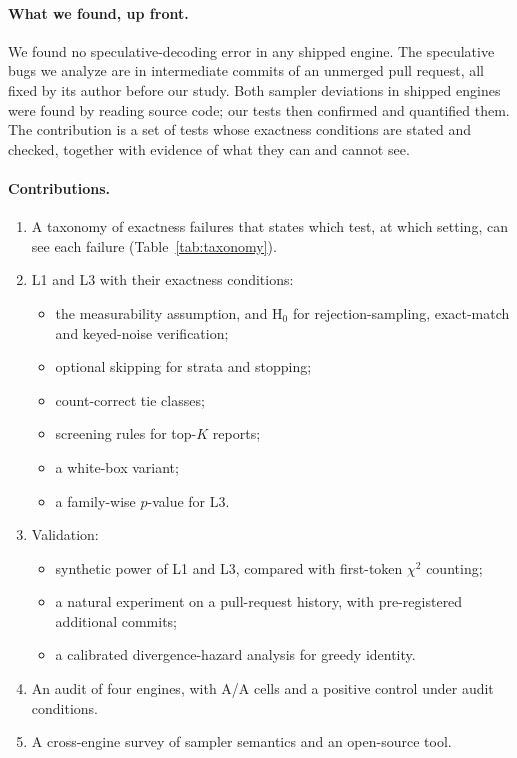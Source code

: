 \documentclass[10pt]{article}
\theoremstyle{remark}
\begin{document}
\paragraph{What we found, up front.} We found no speculative-decoding error in any shipped engine. The speculative bugs we analyze are in intermediate commits of an unmerged pull request, all fixed by its author before our study. Both sampler deviations in shipped engines were found by reading source code; our tests then confirmed and quantified them. The contribution is a set of tests whose exactness conditions are stated and checked, together with evidence of what they can and cannot see.

\paragraph{Contributions.}
\begin{enumerate}
\item A taxonomy of exactness failures that states which test, at which setting, can see each failure (Table~\ref{tab:taxonomy}).
\item L1 and L3 with their exactness conditions:
  \begin{itemize}
  \item the measurability assumption, and H$_0$ for rejection-sampling, exact-match and keyed-noise verification;
  \item optional skipping for strata and stopping;
  \item count-correct tie classes;
  \item screening rules for top-$K$ reports;
  \item a white-box variant;
  \item a family-wise $p$-value for L3.
  \end{itemize}
\item Validation:
  \begin{itemize}
  \item synthetic power of L1 and L3, compared with first-token $\chi^2$ counting;
  \item a natural experiment on a pull-request history, with pre-registered additional commits;
  \item a calibrated divergence-hazard analysis for greedy identity.
  \end{itemize}
\item An audit of four engines, with A/A cells and a positive control under audit conditions.
\item A cross-engine survey of sampler semantics and an open-source tool.
\end{enumerate}
\end{document}
